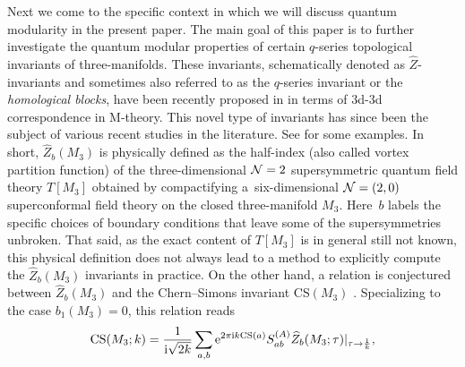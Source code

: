 \documentclass[pdftex]{sigma}
\theoremstyle{definition}
\numberwithin{equation}{section}
\begin{document}
Next we come to the specific context in which we will discuss quantum modularity in the present paper. The main goal of this paper is to further investigate the quantum modular properties of certain $q$-series topological invariants of three-manifolds. These invariants, schematically denoted as $\widehat Z$-invariants and sometimes also referred to as the $q$-series invariant or the {\it homological blocks}, have been recently proposed in \cite{Gukov:2017kmk,Gukov:2016gkn} in terms of 3d-3d correspondence in M-theory.
This novel type of invariants has since been the subject of various recent studies in the literature. See \cite{Chauhan:2022cni,chengUpC,cheng20193d,
Chung:2018rea, Chung:2019jgw, Chung:2020efy, Chung:2022ypb,
Ekholm:2020lqy,2018arXiv181105376E, Ferrari:2020avq, Gukov:2020frk, Matsusaka:2021vbw, Murakami:2023oam,Park:2019xey, Park:2021ufu} for some examples.
In short, $\widehat Z_b(M_3)$ is physically defined as the half-index (also called vortex partition function) of the three-dimensional ${\cal N}=2$ supersymmetric quantum field theory $T[M_3]$ obtained by compactifying a~six-dimensional ${\cal N}=(2,0)$ superconformal field theory on the closed three-manifold $M_3$. Here~$b$ labels the specific choices of boundary conditions that leave some of the supersymmetries unbroken. That said,
as the exact content of $T[M_3]$ is in general still not known, this physical definition does not always lead to a method to explicitly compute the $\widehat Z_b(M_3)$ invariants in practice. On the other hand, a relation is conjectured between $\widehat Z_b(M_3)$ and the Chern--Simons invariant {CS$(M_3)$}
\cite{Gukov:2017kmk}. Specializing to the case $b_1(M_3)=0$, this relation reads
\begin{equation}
\label{ZhatfromCS-SU2-intro}
 \mathrm{CS}(M_3;k) = \frac{1}{{\rm i}\sqrt{2k}}
 \sum_{a,b }
 {\rm e}^{2\pi {\rm i} k {\rm CS}(a) }
 S_{ab}^{(A)} \widehat{Z}_b ( M_3 ; \tau)\lvert_{\tau \to \frac{1}{k}},
\end{equation}
\end{document}
